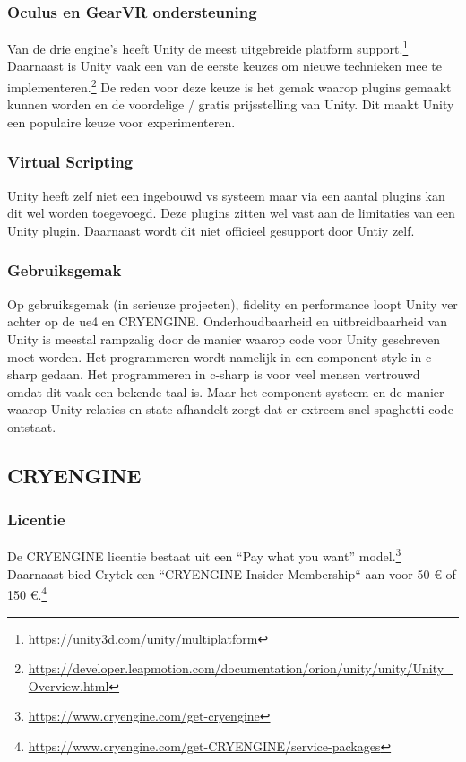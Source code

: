 \subsubsection{Oculus en GearVR ondersteuning}
Van de drie engine’s heeft Unity de meest uitgebreide platform support.\footnote{\url{https://unity3d.com/unity/multiplatform}} Daarnaast is Unity vaak een van de eerste keuzes om nieuwe technieken mee te implementeren.\footnote{\url{https://developer.leapmotion.com/documentation/orion/unity/unity/Unity_Overview.html}} De reden voor deze keuze is het gemak waarop plugins gemaakt kunnen worden en de voordelige / gratis prijsstelling van Unity. Dit maakt Unity een populaire keuze voor experimenteren.

\subsubsection{Virtual Scripting}
Unity heeft zelf niet een ingebouwd \gls{vs} systeem maar via een aantal plugins kan dit wel worden toegevoegd. Deze plugins zitten wel vast aan de limitaties van een Unity plugin. Daarnaast wordt dit niet officieel gesupport door Untiy zelf.

\subsubsection{Gebruiksgemak}
Op gebruiksgemak (in serieuze projecten), fidelity en performance loopt Unity ver achter op de \gls{ue4} en CRYENGINE. Onderhoudbaarheid en uitbreidbaarheid van Unity is meestal rampzalig door de manier waarop code voor Unity geschreven moet worden. Het programmeren wordt namelijk in een component style in c-sharp gedaan. Het programmeren in c-sharp is voor veel mensen vertrouwd omdat dit vaak een bekende taal is. Maar het component systeem en de manier waarop Unity relaties en state afhandelt zorgt dat er extreem snel spaghetti code ontstaat. 

\subsection{CRYENGINE}
\subsubsection{Licentie}
De CRYENGINE licentie bestaat uit een “Pay what you want” model.\footnote{\url{https://www.cryengine.com/get-cryengine}} Daarnaast bied Crytek een “CRYENGINE Insider Membership“ aan voor 50 € of 150 €.\footnote{\url{https://www.cryengine.com/get-CRYENGINE/service-packages}} 

